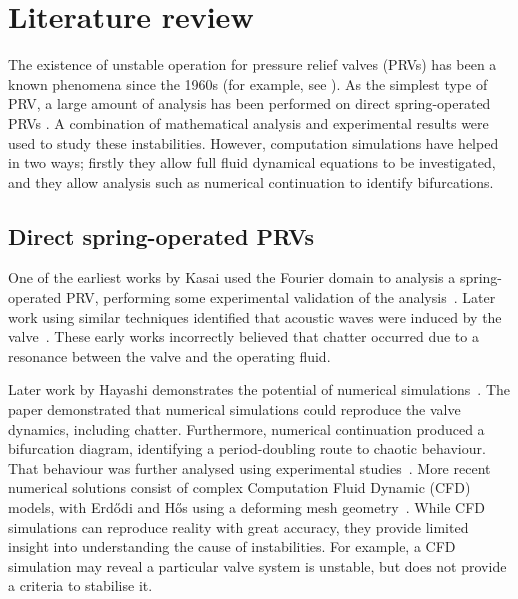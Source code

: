 \chapter{Literature review}

\vspace{-10pt}

The existence of unstable operation for pressure relief valves (PRVs) has been a known phenomena since the 1960s (for example, see \cite{Kasai1968OnSystem}).
As the simplest type of  PRV, a large amount of analysis has been performed on direct spring-operated PRVs \cite{Kasai1968OnSystem,Thomann1976OscillationsPipe,Hayashi1995InstabilityCircuit,Darby2013TheModel,Bazso2013AnValve,Erdodi2017PredictionModelling,Hos2015ModelPipe,Hos2017DynamicRecommendations}. A combination of mathematical analysis and experimental results were used to study these instabilities. However, computation simulations have helped  in two ways; firstly they allow full fluid dynamical equations
to be investigated, and they allow analysis such as numerical continuation to identify bifurcations.

\section{Direct spring-operated PRVs}

One of the earliest works by Kasai used the Fourier domain to analysis a spring-operated PRV, performing some experimental validation of the analysis~\cite{Kasai1968OnSystem}. Later work using similar techniques identified that acoustic waves were induced by the valve~\cite{Thomann1976OscillationsPipe}. These early works incorrectly believed that chatter occurred due to a resonance between the valve and the operating fluid.

Later work by Hayashi demonstrates the potential of numerical simulations~\cite{Hayashi1995InstabilityCircuit}. The paper demonstrated that numerical simulations could reproduce the valve dynamics, including chatter. Furthermore, numerical continuation produced a bifurcation diagram, identifying a period-doubling route to chaotic behaviour. That behaviour was further analysed using experimental studies~\cite{Bazso2013AnValve}. More recent numerical solutions consist of complex Computation Fluid Dynamic (CFD) models, with Erd\H{o}di and H\H{o}s using a deforming mesh geometry~\cite{Erdodi2017PredictionModelling}. While CFD simulations can reproduce reality with great accuracy, they provide limited insight into understanding the cause of instabilities. For example, a CFD simulation may reveal a particular valve system is unstable, but does not provide a criteria to stabilise it.

